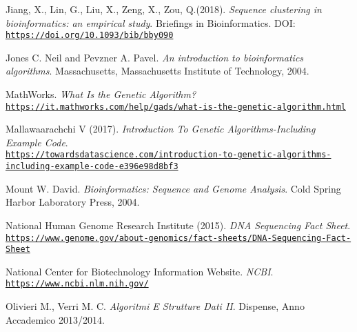 \documentclass[twoside,openright,titlepage,fleqn,
,	headinclude,12pt,a4paper,BCOR5mm,footinclude,table]{scrbook}
\newcommand{\?}{'\-\nobreak\hspace{0pt}}
\begin{document}
\begin{thebibliography}{50}
Jiang, X., Lin, G., Liu, X., Zeng, X., Zou, Q.(2018).\newline
\textit{Sequence clustering in bioinformatics: an empirical study}.\newline
Briefings in Bioinformatics.\newline
DOI: \\\texttt{\url{https://doi.org/10.1093/bib/bby090}}

Jones C. Neil and Pevzner A. Pavel.\newline
\textit{An introduction to bioinformatics algorithms}.\newline
Massachusetts, Massachusetts Institute of Technology, 2004.

MathWorks.\newline
\textit{What Is the Genetic Algorithm?}
\\\texttt{\url{https://it.mathworks.com/help/gads/what-is-the-genetic-algorithm.html}}

Mallawaarachchi V (2017).\newline
\textit{Introduction To Genetic Algorithms-Including Example Code}.
\\\texttt{\url{https://towardsdatascience.com/introduction-to-genetic-algorithms-including-example-code-e396e98d8bf3}}

Mount W. David.\newline
\textit{Bioinformatics: Sequence and Genome Analysis}.\newline
Cold Spring Harbor Laboratory Press, 2004.

National Human Genome Research Institute (2015).\newline
\textit{DNA Sequencing Fact Sheet}.
\\\texttt{\url{https://www.genome.gov/about-genomics/fact-sheets/DNA-Sequencing-Fact-Sheet}}

National Center for Biotechnology Information Website.\newline
\textit{NCBI}.
\\\texttt{\url{https://www.ncbi.nlm.nih.gov/}}

Olivieri M., Verri M. C.\newline
\textit{Algoritmi E Strutture Dati II}.\newline
Dispense, Anno Accademico 2013/2014.


\end{thebibliography}
\end{document}

